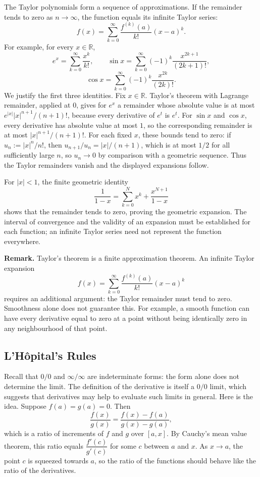 \documentclass[a4paper,11pt,abstracton]{scrartcl}
\newcommand{\RR}{\mathbb{R}}
\theoremstyle{dotlessP}
\theoremstyle{dotlessS}
\theoremstyle{remark}
\theoremstyle{definition}
\begin{document}
The Taylor polynomials form a sequence of approximations. If the
remainder tends to zero as $n\to\infty$, the function equals its
infinite Taylor series:
\[
 f(x)=\sum_{k=0}^{\infty}\frac{f^{(k)}(a)}{k!}(x-a)^k.
\]
For example, for every $x\in\RR$,
\[
 e^x=\sum_{k=0}^{\infty}\frac{x^k}{k!},\qquad
 \sin x=\sum_{k=0}^{\infty}(-1)^k\frac{x^{2k+1}}{(2k+1)!},
\]
\[
 \cos x=\sum_{k=0}^{\infty}(-1)^k\frac{x^{2k}}{(2k)!}.
\]
We justify the first three identities. Fix $x\in\RR$. Taylor's theorem
with Lagrange remainder, applied at $0$, gives for $e^x$ a remainder
whose absolute value is at most
$e^{|x|}|x|^{n+1}/(n+1)!$, because every derivative of $e^t$ is
$e^t$. For $\sin x$ and $\cos x$, every derivative has absolute
value at most $1$, so the corresponding remainder is at most
$|x|^{n+1}/(n+1)!$. For each fixed $x$, these bounds tend to zero:
if $u_n:=|x|^n/n!$, then
$u_{n+1}/u_n=|x|/(n+1)$, which is at most $1/2$ for all sufficiently
large $n$, so $u_n\to0$ by comparison with a geometric sequence.
Thus the Taylor remainders vanish and the displayed expansions follow.

For $|x|<1$, the finite geometric identity
\[
 \frac1{1-x}=\sum_{k=0}^{N}x^k+\frac{x^{N+1}}{1-x}
\]
shows that the remainder tends to zero, proving the geometric
expansion. The interval of convergence and the validity of an
expansion must be established for each function; an infinite Taylor
series need not represent the function everywhere.

\begin{remark_box}
\textbf{Remark.} Taylor's theorem is a finite approximation theorem.
An infinite Taylor expansion
\[
 f(x)=\sum_{k=0}^{\infty}\frac{f^{(k)}(a)}{k!}(x-a)^k
\]
requires an additional argument: the Taylor remainder must tend to
zero. Smoothness alone does not guarantee this. For example, a smooth
function can have every derivative equal to zero at a point without
being identically zero in any neighbourhood of that point.
\end{remark_box}

\subsection{L'H\^opital's Rules}

Recall that $0/0$ and $\infty/\infty$ are indeterminate forms: the form alone does not determine the limit. The definition of the derivative is itself a $0/0$ limit, which suggests that derivatives may help to evaluate such limits in general. Here is the idea. Suppose $f(a)=g(a)=0$. Then
\[
    \frac{f(x)}{g(x)}=\frac{f(x)-f(a)}{g(x)-g(a)},
\]
which is a ratio of increments of $f$ and $g$ over $[a,x]$. By Cauchy's mean value theorem, this ratio equals $\dfrac{f'(c)}{g'(c)}$ for some $c$ between $a$ and $x$. As $x\to a$, the point $c$ is squeezed towards $a$, so the ratio of the functions should behave like the ratio of the derivatives.
\end{document}

